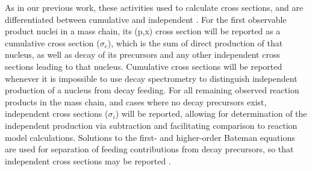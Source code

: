 As in our previous work, these activities used to calculate cross sections, and are differentiated between cumulative and independent \cite{Voyles2018a}.
For the first observable product nuclei in a mass chain, its (p,x) cross section will be reported as a cumulative cross section ($\sigma_c$), which is the sum of direct production of that nucleus, as well as decay of its  precursors and any other independent cross sections leading to that nucleus. 
Cumulative cross sections will be reported whenever it is impossible to use decay spectrometry to distinguish independent production of a nucleus from decay feeding.
For all remaining observed reaction products in the mass chain, and cases where no decay precursors exist, independent cross sections ($\sigma_i$) will be reported, allowing for determination of the independent production via subtraction  and facilitating comparison to reaction model calculations.  
Solutions to the first- and higher-order  Bateman equations are used for separation of  feeding contributions from decay precursors, so that  independent cross sections may be reported \cite{bateman1910solution,Cetnar2006}.







